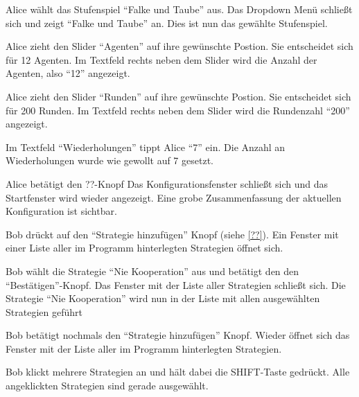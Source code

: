 \documentclass[parskip=full,11pt]{scrartcl}
\begin{document}
{Alice wählt das Stufenspiel \enquote{Falke und Taube} aus.}
{Das Dropdown Menü schließt sich und zeigt \enquote{Falke und Taube} an. Dies ist nun das gewählte Stufenspiel.}

{Alice zieht den Slider \enquote{Agenten} auf ihre gewünschte Postion. Sie entscheidet sich für 12 Agenten.}%
{Im Textfeld rechts neben dem Slider wird die Anzahl der Agenten, also \enquote{12} angezeigt.}

{Alice zieht den Slider \enquote{Runden} auf ihre gewünschte Postion. Sie entscheidet sich für 200 Runden.}%
{Im Textfeld rechts neben dem Slider wird die Rundenzahl \enquote{200} angezeigt.}

{Im Textfeld \enquote{Wiederholungen} tippt Alice \enquote{7} ein.}%
{Die Anzahl an Wiederholungen wurde wie gewollt auf 7 gesetzt.}

{Alice betätigt den ??-Knopf}
{Das Konfigurationsfenster schließt sich und das Startfenster wird wieder angezeigt. Eine grobe Zusammenfassung der aktuellen Konfiguration ist sichtbar.}


%
{Bob drückt auf den \enquote{Strategie hinzufügen} Knopf (siehe \cref{??}).}
{Ein Fenster mit einer Liste aller im Programm hinterlegten Strategien öffnet sich.}

{Bob wählt die Strategie \enquote{Nie Kooperation} aus und betätigt den den \enquote{Bestätigen}-Knopf.}
{Das Fenster mit der Liste aller Strategien schließt sich. Die Strategie \enquote{Nie Kooperation} wird nun in der Liste mit allen ausgewählten Strategien geführt}

{Bob betätigt nochmals den  \enquote{Strategie hinzufügen} Knopf.}
{Wieder öffnet sich das Fenster mit der Liste aller im Programm hinterlegten Strategien.}

{Bob klickt mehrere Strategien an und hält dabei die SHIFT-Taste gedrückt.}
{Alle angeklickten Strategien sind gerade ausgewählt.}
\end{document}
